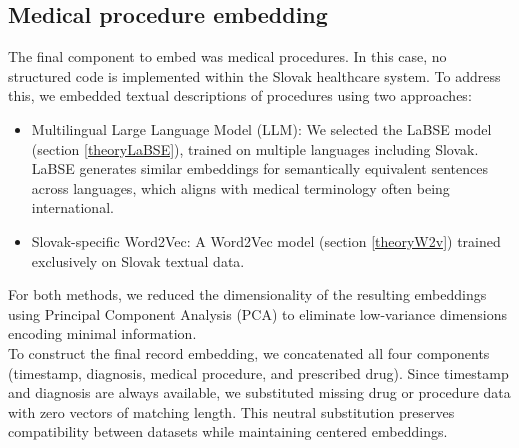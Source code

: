 \subsection{Medical procedure embedding}
\label{procedureEmb}

The final component to embed was medical procedures. In this case, no structured code is implemented within the Slovak healthcare system. To address this, we embedded textual descriptions of procedures using two approaches:

\begin{itemize}
	\item Multilingual Large Language Model (LLM): We selected the LaBSE model (section \ref{theoryLaBSE}), trained on multiple languages including Slovak. LaBSE generates similar embeddings for semantically equivalent sentences across languages, which aligns with medical terminology often being international.
	\item Slovak-specific Word2Vec: A Word2Vec model (section \ref{theoryW2v}) trained exclusively on Slovak textual data.
\end{itemize}

For both methods, we reduced the dimensionality of the resulting embeddings using Principal Component Analysis (PCA) to eliminate low-variance dimensions encoding minimal information.
\\

To construct the final record embedding, we concatenated all four components (timestamp, diagnosis, medical procedure, and prescribed drug). Since timestamp and diagnosis are always available, we substituted missing drug or procedure data with zero vectors of matching length. This neutral substitution preserves compatibility between datasets while maintaining centered embeddings.